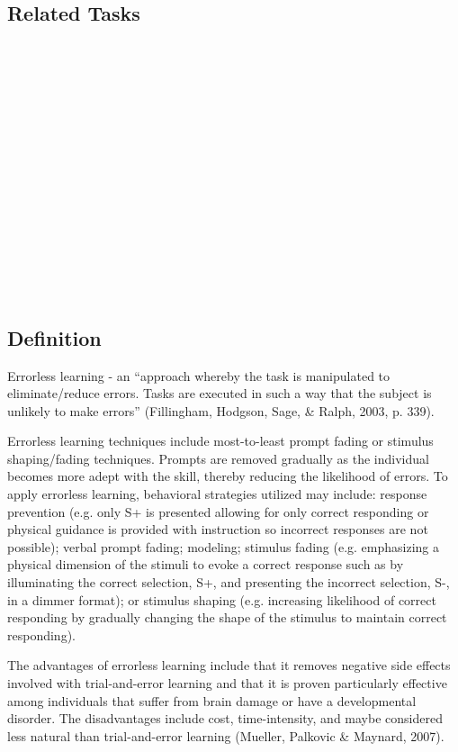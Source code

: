 \subsection{Related Tasks}
\fourcOne{}\\
\fourdOne{}\\
\fourdTwo{}\\
\foureTwo{}\\
\fourfTwo{}\\
\fouriSeven{}\\
\fourjFour{}\\
\fourjEleven{}\\
\fourFKFourteen{}\\
\fourFKSixteen{}\\
\fourFKEighteen{}\\
\fourFKTwentyOne{}\\
\fourFKTwentySeven{}\\
\fourFKThirtyFour{}\\
%
%
%
%
%
%
\section{\foureTwelve{}}
\subsection{Definition}
Errorless learning - an ``approach whereby the task is manipulated to eliminate/reduce errors. Tasks are executed in such a way that the subject is unlikely to make errors'' (Fillingham, Hodgson, Sage, \& Ralph, 2003, p. 339). 

Errorless learning techniques include most-to-least prompt fading or stimulus shaping/fading techniques. Prompts are removed gradually as the individual becomes more adept with the skill, thereby reducing the likelihood of errors.  To apply errorless learning, behavioral strategies utilized may include: response prevention (e.g. only S+ is presented allowing for only correct responding or physical guidance is provided with instruction so incorrect responses are not possible); verbal prompt fading; modeling; stimulus fading (e.g. emphasizing a physical dimension of the stimuli to evoke a correct response such as by illuminating the correct selection, S+, and presenting the incorrect selection, S-, in a dimmer format); or stimulus shaping (e.g. increasing likelihood of correct responding by gradually changing the shape of the stimulus to maintain correct responding). 

The advantages of errorless learning include that it removes negative side effects involved with trial-and-error learning and that it is proven particularly effective among individuals that suffer from brain damage or have a developmental disorder. The disadvantages include cost, time-intensity, and maybe considered less natural than trial-and-error learning (Mueller, Palkovic \& Maynard, 2007).

